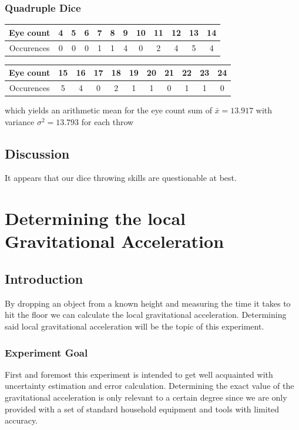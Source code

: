 \documentclass{scrreprt}
\begin{document}
\subsection{Quadruple Dice}

\begin{center}
    \begin{tabular}{|c|ccccccccccc|}
    \hline
    Eye count & 4 & 5 & 6 & 7 & 8 & 9 & 10 & 11 & 12 & 13 & 14\\ 
    \hline
    Occurences & 0 & 0 & 0 & 1 & 1 & 4 & 0 & 2 & 4 & 5 & 4\\
    \hline
    \end{tabular}
    \begin{tabular}{|c|cccccccccc|}
    \hline
    Eye count & 15 & 16 & 17 & 18 & 19 & 20 & 21 & 22 & 23 & 24\\
    \hline
    Occurences & 5 & 4 & 0 & 2 & 1 & 1 & 0 & 1 & 1 & 0\\
    \hline
    \end{tabular}
\end{center}

which yields an arithmetic mean for the eye count sum of $\bar{x} = 13.917$ with variance $\sigma^2 = 13.793$ for each throw\\

\section{Discussion}
It appears that our dice throwing skills are questionable at best. 

\chapter[Gravitational Acceleration]{Determining the local Gravitational Acceleration}
\section{Introduction}
By dropping an object from a known height and measuring the time it takes to hit the floor we can calculate the local gravitational acceleration. Determining said local gravitational acceleration will be the topic of this experiment.

\subsection{Experiment Goal}
First and foremost this experiment is intended to get well acquainted with uncertainty estimation and error calculation. Determining the exact value of the gravitational acceleration is only relevant to a certain degree since we are only provided with a set of standard household equipment and tools with limited accuracy.
\end{document}
